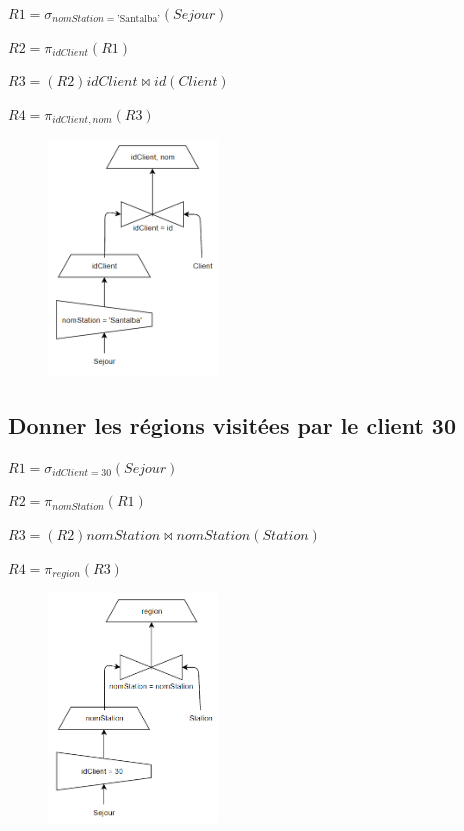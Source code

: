 \documentclass{article}
\begin{document}
$ R1 = \sigma_{nomStation = \text{'Santalba'}}(Sejour)$

$ R2 = \pi_{idClient}(R1)$

$ R3 = (R2)idClient \Join id(Client)$

$ R4 = \pi_{idClient, nom}(R3)$

\begin{figure}[H]
  \centering
  \includegraphics[width=0.4\textwidth]{imgAlgGraph/12.png}
  \label{fig:12}
\end{figure}

\subsection{Donner les régions visitées par le client 30}

$ R1 = \sigma_{idClient = 30}(Sejour)$

$ R2 = \pi_{nomStation}(R1)$

$ R3 = (R2)nomStation \Join nomStation(Station)$

$ R4 = \pi_{region}(R3)$

\begin{figure}[H]
  \centering
  \includegraphics[width=0.4\textwidth]{imgAlgGraph/13.png}
  \label{fig:13}
\end{figure}
\end{document}
